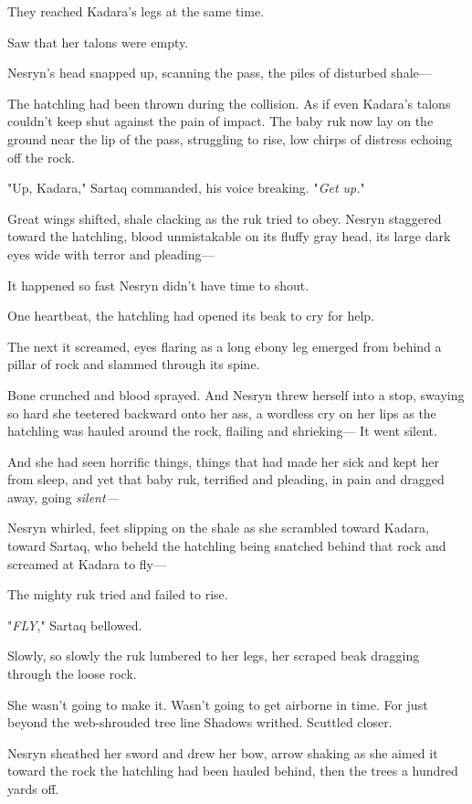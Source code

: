 They reached Kadara's legs at the same time.

Saw that her talons were empty.

Nesryn's head snapped up, scanning the pass, the piles of disturbed shale---

The hatchling had been thrown during the collision. As if even Kadara's talons couldn't keep shut against the pain of impact. The baby ruk now lay on the ground near the lip of the pass, struggling to rise, low chirps of distress echoing off the rock.

"Up, Kadara," Sartaq commanded, his voice breaking. "\emph{Get up.}"

Great wings shifted, shale clacking as the ruk tried to obey. Nesryn staggered toward the hatchling, blood unmistakable on its fluffy gray head, its large dark eyes wide with terror and pleading---

It happened so fast Nesryn didn't have time to shout.

One heartbeat, the hatchling had opened its beak to cry for help.

The next it screamed, eyes flaring as a long ebony leg emerged from behind a pillar of rock and slammed through its spine.

Bone crunched and blood sprayed. And Nesryn threw herself into a stop, swaying so hard she teetered backward onto her ass, a wordless cry on her lips as the hatchling was hauled around the rock, flailing and shrieking--- It went silent.

And she had seen horrific things, things that had made her sick and kept her from sleep, and yet that baby ruk, terrified and pleading, in pain and dragged away, going \emph{silent---}

Nesryn whirled, feet slipping on the shale as she scrambled toward Kadara, toward Sartaq, who beheld the hatchling being snatched behind that rock and screamed at Kadara to fly---

The mighty ruk tried and failed to rise.

"\emph{FLY}," Sartaq bellowed.

Slowly, so slowly the ruk lumbered to her legs, her scraped beak dragging through the loose rock.

She wasn't going to make it. Wasn't going to get airborne in time. For just beyond the web-shrouded tree line  Shadows writhed. Scuttled closer.

Nesryn sheathed her sword and drew her bow, arrow shaking as she aimed it toward the rock the hatchling had been hauled behind, then the trees a hundred yards off.

